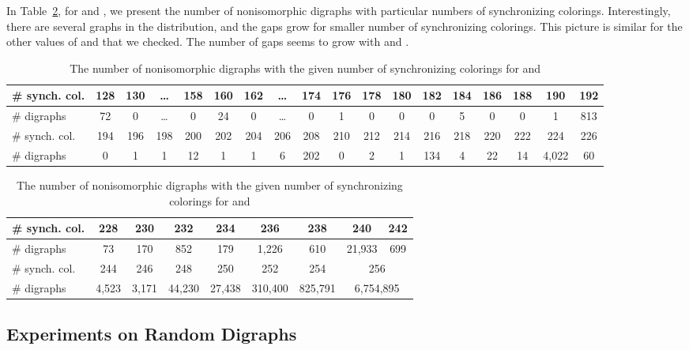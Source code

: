 \documentclass[runningheads]{llncs}
\begin{document}
In Table~\ref{tab:gaps}, for  and , we present the number of nonisomorphic digraphs with particular numbers of synchronizing colorings.
Interestingly, there are several graphs in the distribution, and the gaps grow for smaller number of synchronizing colorings.
This picture is similar for the other values of  and  that we checked. The number of gaps seems to grow with  and .

\begin{table}
\caption{The number of nonisomorphic digraphs with the given number of synchronizing colorings for  and }
\label{tab:gaps}
\begin{center}
\begin{tabular}{|l||c|c|c|c|c|c|c|c|c|c|c|c|c|c|c|c|c|} \hline
\# synch. col. & 128 & 130 & \ldots & 158 & 160 & 162 & \ldots & 174 & 176 & 178 & 180 & 182 & 184 & 186 & 188 & 190  & 192 \\ \hline
\# digraphs    & 72  & 0   & \ldots & 0   & 24  & 0   & \ldots & 0   & 1   & 0   & 0   & 0   & 5   & 0   & 0   & 1    & 813 \\ \hline\hline
\# synch. col. & 194 & 196 & 198    & 200 & 202 & 204 & 206    & 208 & 210 & 212 & 214 & 216 & 218 & 220 & 222 & 224  & 226 \\ \hline
\# digraphs    & 0   & 1   & 1      & 12  & 1   & 1   & 6      & 202 & 0   & 2   & 1   & 134 & 4   & 22  & 14  & 4,022& 60  \\ \hline
\end{tabular}
\end{center}
\begin{center}
\begin{tabular}{|l||c|c|c|c|c|c|c|c|} \hline
\# synch. col. & 228   & 230  & 232   & 234    & 236    & 238    & 240      & 242 \\ \hline
\# digraphs    & 73    & 170  & 852   & 179    & 1,226  & 610    & 21,933   & 699 \\ \hline \hline
\# synch. col. & 244   & 246  & 248   & 250    & 252    & 254    & \multicolumn{2}{c|}{256} \\ \hline
\# digraphs    & 4,523 & 3,171& 44,230& 27,438 & 310,400& 825,791& \multicolumn{2}{c|}{6,754,895} \\ \hline
\end{tabular}
\end{center}
\end{table}

\subsection{Experiments on Random Digraphs}
\end{document}
